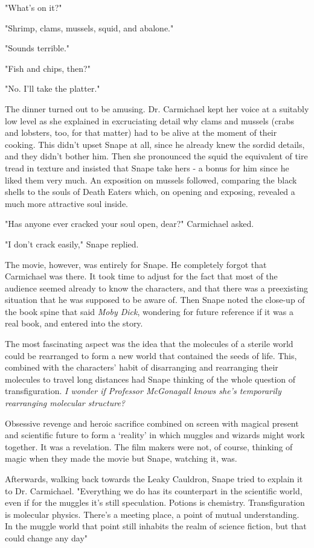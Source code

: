 "What's on it?"

"Shrimp, clams, mussels, squid, and abalone."

"Sounds terrible."

"Fish and chips, then?"

"No. I'll take the platter."

The dinner turned out to be amusing. Dr. Carmichael kept her voice at a suitably low level as she explained in excruciating detail why clams and mussels (crabs and lobsters, too, for that matter) had to be alive at the moment of their cooking. This didn't upset Snape at all, since he already knew the sordid details, and they didn't bother him. Then she pronounced the squid the equivalent of tire tread in texture and insisted that Snape take hers - a bonus for him since he liked them very much. An exposition on mussels followed, comparing the black shells to the souls of Death Eaters which, on opening and exposing, revealed a much more attractive soul inside.

"Has anyone ever cracked your soul open, dear?" Carmichael asked.

"I don't crack easily," Snape replied.

The movie, however, was entirely for Snape. He completely forgot that Carmichael was there. It took time to adjust for the fact that most of the audience seemed already to know the characters, and that there was a preexisting situation that he was supposed to be aware of. Then Snape noted the close-up of the book spine that said \emph{Moby Dick}, wondering for future reference if it was a real book, and entered into the story.

The most fascinating aspect was the idea that the molecules of a sterile world could be rearranged to form a new world that contained the seeds of life. This, combined with the characters' habit of disarranging and rearranging their molecules to travel long distances had Snape thinking of the whole question of transfiguration. \emph{I wonder if Professor McGonagall knows she's temporarily rearranging molecular structure?}

Obsessive revenge and heroic sacrifice combined on screen with magical present and scientific future to form a `reality' in which muggles and wizards might work together. It was a revelation. The film makers were not, of course, thinking of magic when they made the movie but Snape, watching it, was.

Afterwards, walking back towards the Leaky Cauldron, Snape tried to explain it to Dr. Carmichael. "Everything we do has its counterpart in the scientific world, even if for the muggles it's still speculation. Potions is chemistry. Transfiguration is molecular physics. There's a meeting place, a point of mutual understanding. In the muggle world that point still inhabits the realm of science fiction, but that could change any day{\el}"

